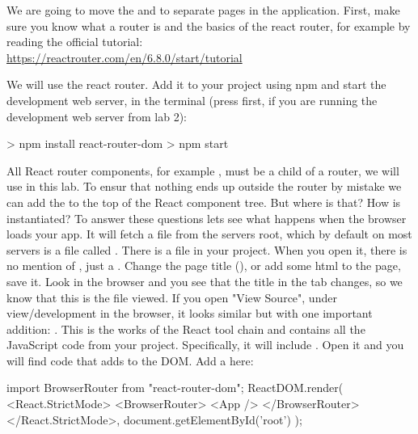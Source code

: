 \documentclass[fleqn, article, a4paper]{memoir}
\begin{document}
\begin{Assignments}

\item We are going to move the  and  to separate pages in the application. First, make sure you know what a router is and the basics of the react router, for example by reading the official tutorial: 
\\ \url{https://reactrouter.com/en/6.8.0/start/tutorial}

\item We will use the react router. Add it to your project using npm and start the development web server, in the terminal (press  first, if you are running the development web server from lab 2):
\begin{Code}
> npm install react-router-dom
> npm start
\end{Code}

\item All React router components, for example , must be a child of a router, we will use  in this lab. To ensur that nothing ends up outside the router by mistake we can add the  to the top of the React component tree. But where is that? How is  instantiated? To answer these questions lets see what happens when the browser loads your app. It will fetch a file from the servers root, which by default on most servers is a file called  . There is a  file in your project. When you open it, there is no mention of , just a . Change the page title (), or add some html to the page, save it. Look in the browser and you see that the title in the tab changes, so we know that this is the file viewed. If you open "View Source", under view/development in the browser, it looks similar but with one important addition: . This is the works of the React tool chain and  contains all the JavaScript code from your project. Specifically, it will include . Open it and you will find code that adds  to the DOM. Add a  here:

\begin{Code}
import { BrowserRouter } from "react-router-dom";
ReactDOM.render(
  <React.StrictMode>
    <BrowserRouter>
      <App />
    </BrowserRouter>
  </React.StrictMode>,
  document.getElementById('root')
);
\end{Code}


\end{Assignments}
\end{document}
